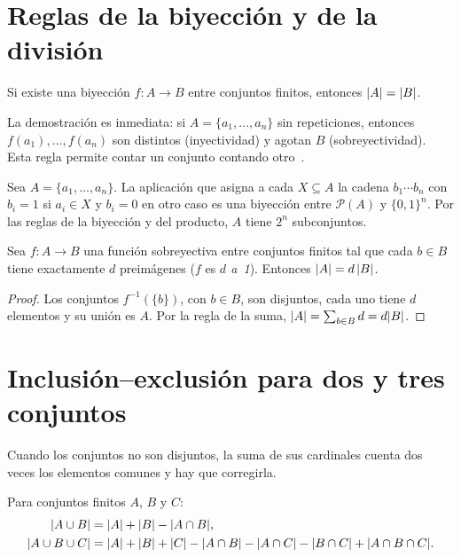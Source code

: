 \section{Reglas de la biyección y de la división}

\begin{proposicion}\label{prop:t1-biyeccion}
Si existe una biyección $f\colon A\to B$ entre conjuntos finitos, entonces $\lvert A\rvert=\lvert B\rvert$.
\end{proposicion}

La demostración es inmediata: si $A=\{a_1,\dots,a_n\}$ sin repeticiones, entonces $f(a_1),\dots,f(a_n)$ son distintos (inyectividad) y agotan $B$ (sobreyectividad). Esta regla permite contar un conjunto contando otro~\cite[§14.1]{mcs}.

\begin{ejemplo}\label{ej:t1-bits}
Sea $A=\{a_1,\dots,a_n\}$. La aplicación que asigna a cada $X\subseteq A$ la cadena $b_1\cdots b_n$ con $b_i=1$ si $a_i\in X$ y $b_i=0$ en otro caso es una biyección entre $\mathcal{P}(A)$ y $\{0,1\}^{n}$. Por las reglas de la biyección y del producto, $A$ tiene $2^{n}$ subconjuntos.
\end{ejemplo}

\begin{proposicion}\label{prop:t1-division}
Sea $f\colon A\to B$ una función sobreyectiva entre conjuntos finitos tal que cada $b\in B$ tiene exactamente $d$ preimágenes ($f$ es \emph{$d$ a~1}). Entonces $\lvert A\rvert=d\,\lvert B\rvert$.
\end{proposicion}

\begin{proof}
Los conjuntos $f^{-1}(\{b\})$, con $b\in B$, son disjuntos, cada uno tiene $d$ elementos y su unión es $A$. Por la regla de la suma, $\lvert A\rvert=\sum_{b\in B}d=d\lvert B\rvert$.
\end{proof}

\section{Inclusión--exclusión para dos y tres conjuntos}

Cuando los conjuntos no son disjuntos, la suma de sus cardinales cuenta dos veces los elementos comunes y hay que corregirla.

\begin{teorema}\label{teo:t1-ie}
Para conjuntos finitos $A$, $B$ y $C$:
\begin{align*}
\lvert A\cup B\rvert&=\lvert A\rvert+\lvert B\rvert-\lvert A\cap B\rvert,\\
\lvert A\cup B\cup C\rvert&=\lvert A\rvert+\lvert B\rvert+\lvert C\rvert-\lvert A\cap B\rvert-\lvert A\cap C\rvert-\lvert B\cap C\rvert+\lvert A\cap B\cap C\rvert.
\end{align*}
\end{teorema}

